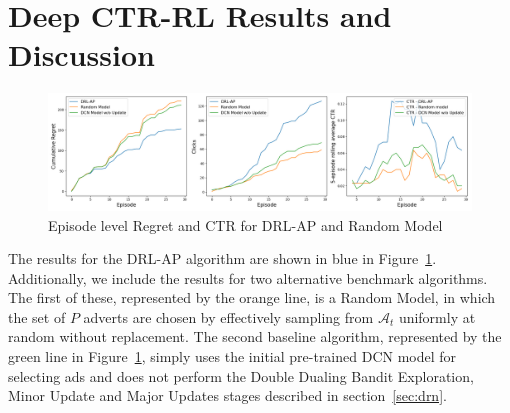 \documentclass{mldsmsc}
\begin{document}
\section{Deep CTR-RL Results and Discussion}

\begin{figure}[h]
    \centering
    \includegraphics[width=\textwidth]{../figures/drl-ap.png}
    \caption{Episode level Regret and CTR for DRL-AP and Random Model}
    \label{fig:drl-ap}
\end{figure}

The results for the DRL-AP algorithm are shown in blue in Figure~\ref{fig:drl-ap}. 
Additionally, we include the results for two alternative benchmark algorithms. The first
of these, represented by the orange line, is a Random Model, in which the set of 
$P$ adverts are chosen by effectively sampling from $\mathcal{A}_t$ uniformly at random without
replacement. The second baseline algorithm, represented by the green line in Figure~\ref{fig:drl-ap},
simply uses the initial pre-trained DCN model for selecting ads and does not perform the Double Dualing
Bandit Exploration, Minor Update and Major Updates stages described in section~\ref{sec:drn}.
\end{document}
